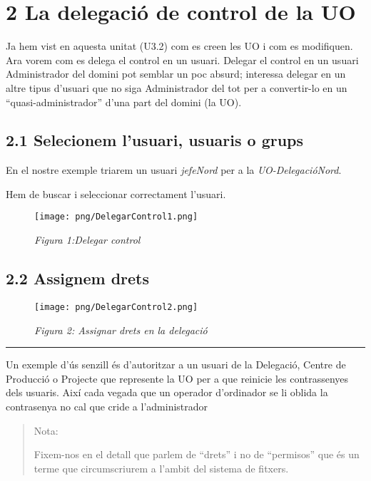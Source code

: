 \documentclass[
  a4paper,
]{article}
\begin{document}
\section{2 La delegació de control de la
UO}\label{la-delegaciuxf3-de-control-de-la-uo}

Ja hem vist en aquesta unitat (U3.2) com es creen les UO i com es
modifiquen. Ara vorem com es delega el control en un usuari. Delegar el
control en un usuari Administrador del domini pot semblar un poc absurd;
interessa delegar en un altre tipus d'usuari que no siga Administrador
del tot per a convertir-lo en un ``quasi-administrador'' d'una part del
domini (la UO).

\subsection{2.1 Selecionem l'usuari, usuaris o
grups}\label{selecionem-lusuari-usuaris-o-grups}

En el nostre exemple triarem un usuari \emph{jefeNord} per a la
\emph{UO-DelegacióNord}.

Hem de buscar i seleccionar correctament l'usuari.

\begin{figure}
\centering
\texttt{[image: png/DelegarControl1.png]}
\caption{\emph{Figura 1:Delegar control}}
\end{figure}

\subsection{2.2 Assignem drets}\label{assignem-drets}

\begin{figure}
\centering
\texttt{[image: png/DelegarControl2.png]}
\caption{\emph{Figura 2: Assignar drets en la delegació}}
\end{figure}

\begin{center}\rule{0.5\linewidth}{0.5pt}\end{center}

Un exemple d'ús senzill és d'autoritzar a un usuari de la Delegació,
Centre de Producció o Projecte que represente la UO per a que reinicie
les contrassenyes dels usuaris. Així cada vegada que un operador
d'ordinador se li oblida la contrasenya no cal que cride a
l'administrador

\begin{quote}
Nota:

Fixem-nos en el detall que parlem de ``drets'' i no de ``permisos'' que
és un terme que circumscriurem a l'ambit del sistema de fitxers.
\end{quote}
\end{document}
